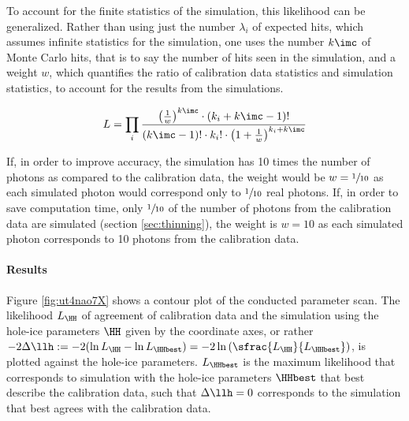 %
%

To account for the finite statistics of the simulation, this likelihood can be generalized. Rather than using just the number $\lambda_i$ of expected hits, which assumes infinite statistics for the simulation, one uses the number $k\imc$ of Monte Carlo hits, that is to say the number of hits seen in the simulation, and a weight $w$, which quantifies the ratio of calibration data statistics and simulation statistics, to account for the results from the simulations. \cite[equation 21]{Gluesenkamp2018}

\begin{equation}
  L = \prod_{i} \frac%
    {\left(\frac{1}{w}\right)^{k\imc} \cdot \left(k_i + k\imc - 1\right)!}%
    {(k\imc - 1)! \cdot k_i! \cdot \left( 1 + \frac{1}{w} \right)^{k_i + k\imc}}
\end{equation}

If, in order to improve accuracy, the simulation has 10 times the number of photons as compared to the calibration data, the weight would be $w=\sfrac{1}{10}$ as each simulated photon would correspond only to $\sfrac{1}{10}$ real photons. If, in order to save computation time, only $\sfrac{1}{10}$ of the number of photons from the calibration data are simulated (section \ref{sec:thinning}), the weight is $w=10$ as each simulated photon corresponds to 10 photons from the calibration data.


\paragraph{Results}
Figure \ref{fig:ut4nao7X} shows a contour plot of the conducted parameter scan. The likelihood $L_\HH$ of agreement of calibration data and the simulation using the hole-ice parameters $\HH$ given by the coordinate axes, or rather $-2\Delta\llh:= -2(\ln L_\HH - \ln L_\HHbest) = -2 \ln \left(\sfrac{L_\HH}{L_\HHbest}\right)$, is plotted against the hole-ice parameters. $L_\HHbest$ is the maximum likelihood that corresponds to simulation with the hole-ice parameters $\HHbest$ that best describe the calibration data, such that $\Delta\llh = 0$ corresponds to the simulation that best agrees with the calibration data.

